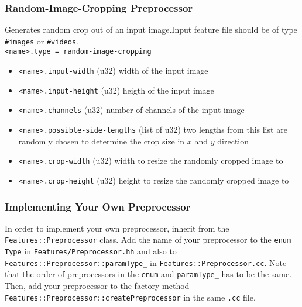 \subsubsection*{Random-Image-Cropping Preprocessor}
Generates random crop out of an input image.Input feature file should be of type \texttt{\#images} or \texttt{\#videos}.\\
\texttt{<name>.type = random-image-cropping}
\begin{itemize}
    \item \texttt{<name>.input-width} (u32) width of the input image
    \item \texttt{<name>.input-height} (u32) heigth of the input image
    \item \texttt{<name>.channels} (u32) number of channels of the input image
    \item \texttt{<name>.possible-side-lengths} (list of u32) two lengths from this list are randomly chosen to determine the crop size in $ x $ and $ y $ direction
    \item \texttt{<name>.crop-width} (u32) width to resize the randomly cropped image to
    \item \texttt{<name>.crop-height} (u32) height to resize the randomly cropped image to
\end{itemize}

\subsubsection{Implementing Your Own Preprocessor}

In order to implement your own preprocessor, inherit from the \texttt{Features::Preprocessor} class. Add the name of your preprocessor to the \texttt{enum Type} in \texttt{Features/Preprocessor.hh} and also to \texttt{Features::Preprocessor::paramType\_} in \texttt{Features::Preprocessor.cc}. Note that the order of preprocessors in the \texttt{enum} and \texttt{paramType\_} has to be the same. Then, add your preprocessor to the factory method \texttt{Features::Preprocessor::createPreprocessor} in the same \texttt{.cc} file.

